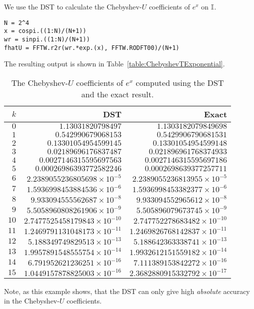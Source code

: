 \begin{example}\label{Example:DST}
We use the DST to calculate the Chebyshev-$U$ coefficients of $e^x$ on $\mathbb{I}$.
\begin{verbatim}
N = 2^4
x = cospi.((1:N)/(N+1))
wr = sinpi.((1:N)/(N+1))
fhatU = FFTW.r2r(wr.*exp.(x), FFTW.RODFT00)/(N+1)
\end{verbatim}
The resulting output is shown in Table~\ref{table:ChebyshevTExponential}.
\begin{table}[htdp]
\caption{The Chebyshev-$U$ coefficients of $e^x$ computed using the DST and the exact result.}
\begin{center}
\begin{tabular}{rrr}
\hline
$k$ & DST & Exact\\
\hline
$0$ & $1.13031820798497$ & $1.1303182079849698$\\
$1$ & $0.542990679068153$ & $0.5429906790681531$\\
$2$ & $0.13301054954599145$ & $0.13301054954599148$\\
$3$ & $0.02189696176837487$ & $0.021896961768374933$\\
$4$ & $0.0027146315595697563$ & $0.0027146315595697186$\\
$5$ & $0.00026986393772582246$ & $0.0002698639377257711$\\
$6$ & $2.2389055236805698\times10^{-5}$ & $2.2389055236813955\times10^{-5}$\\
$7$ & $1.5936998453884536\times10^{-6}$ & $1.5936998453382377\times10^{-6}$\\
$8$ & $9.933094555562687\times10^{-8}$ & $9.933094552965612\times10^{-8}$\\
$9$ & $5.5058960808261906\times10^{-9}$ & $5.505896079673745\times10^{-9}$\\
$10$ & $2.7477525458179843\times10^{-10}$ & $2.747752278683482\times10^{-10}$\\
$11$ & $1.2469791131048173\times10^{-11}$ & $1.2469826768142837\times10^{-11}$\\
$12$ & $5.188349749829513\times10^{-13}$ & $5.188642363338741\times10^{-13}$\\
$13$ & $1.9957891548555754\times10^{-14}$ & $1.9932612151559182\times10^{-14}$\\
$14$ & $6.791952621236251\times10^{-16}$ & $7.111389153842272\times10^{-16}$\\
$15$ & $1.0449157878825003\times10^{-16}$ & $2.3682880915332792\times10^{-17}$\\
\hline
\end{tabular}
\end{center}
\label{table:ChebyshevUExponential}
\end{table}%
Note, as this example shows, that the DST can only give high {\em absolute} accuracy in the Chebyshev-$U$ coefficients.
\end{example}

